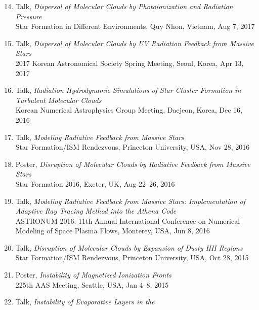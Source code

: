 \documentclass[11pt,letterpaper,roman]{moderncv}        %
\newenvironment{benumerate}[1]{
  \let\oldItem\item
  \def\item{\addtocounter{enumi}{-2}\oldItem}
  \begin{enumerate}[itemsep=0.0mm]
    \setcounter{enumi}{#1}
    \addtocounter{enumi}{1}
  }{
  \end{enumerate}
}
\begin{document}
\begin{benumerate}{13}
\item Talk, \textit{Dispersal of Molecular Clouds by
    Photoionization and Radiation Pressure}\\Star Formation in
  Different Environments, Quy Nhon, Vietnam, Aug 7, 2017
\item Talk, \textit{Dispersal of Molecular Clouds by UV
    Radiation Feedback from Massive Stars}\\ 2017 Korean Astronomical
  Society Spring Meeting, Seoul, Korea, Apr 13, 2017
\item Talk, \textit{Radiation Hydrodynamic Simulations of Star Cluster
    Formation in Turbulent Molecular Clouds}\\ Korean Numerical
  Astrophysics Group Meeting, Daejeon, Korea, Dec 16, 2016
\item Talk, \textit{Modeling Radiative Feedback from Massive
    Stars}\\Star Formation/ISM Rendezvous, Princeton University, USA,
  Nov 28, 2016
\item Poster, \textit{Disruption of Molecular Clouds by Radiative
    Feedback from Massive Stars}\\Star Formation 2016, Exeter, UK, Aug
  22--26, 2016
\item Talk, \textit{Modeling Radiative Feedback from Massive Stars:
    Implementation of Adaptive Ray Tracing Method into the Athena
    Code}\\ ASTRONUM 2016: 11th Annual International Conference on
  Numerical Modeling of Space Plasma Flows, Monterey, USA, Jun 8, 2016
\item Talk, \textit{Disruption of Molecular Clouds by
    Expansion of Dusty HII Regions}\\ Star Formation/ISM Rendezvous,
  Princeton University, USA, Oct 28, 2015
\item Poster, \textit{Instability of Magnetized Ionization Fronts}\\
  225th AAS Meeting, Seattle, USA, Jan 4--8, 2015
\item Talk, \textit{Instability of Evaporative Layers in the
}
\end{benumerate}
\end{document}
